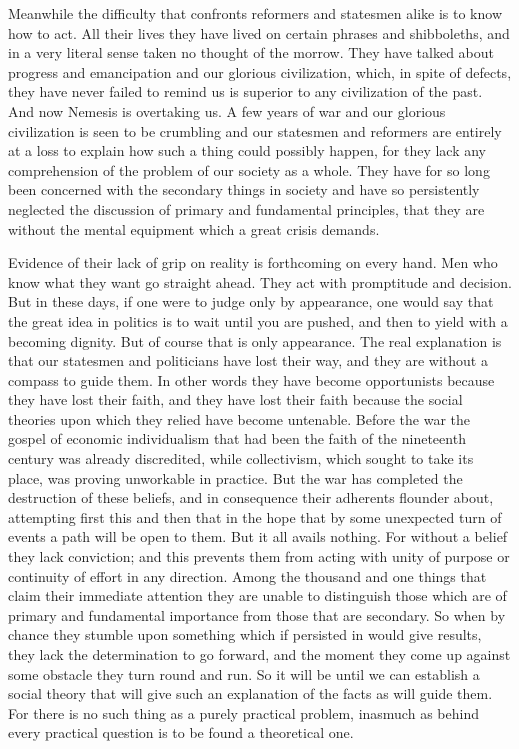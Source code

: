 \documentclass{book}
\begin{document}
Meanwhile the difficulty that confronts reformers and statesmen alike is to know how to act. All their lives they have lived on certain phrases and shibboleths, and in a very literal sense taken no thought of the morrow. They have talked about progress and emancipation and our glorious civilization, which, in spite of defects, they have never failed to remind us is superior to any civilization of the past. And now Nemesis is overtaking us. A few years of war and our glorious civilization is seen to be crumbling and our statesmen and reformers are entirely at a loss to explain how such a thing could possibly happen, for they lack any comprehension of the problem of our society as a whole. They have for so long been concerned with the secondary things in society and have so persistently neglected the discussion of primary and fundamental principles, that they are without the mental equipment which a great crisis demands.

Evidence of their lack of grip on reality is forthcoming on every hand. Men who know what they want go straight ahead. They act with promptitude and decision. But in these days, if one were to judge only by appearance, one would say that the great idea in politics is to wait until you are pushed, and then to yield with a becoming dignity. But of course that is only appearance. The real explanation is that our statesmen and politicians have lost their way, and they are without a compass to guide them. In other words they have become opportunists because they have lost their faith, and they have lost their faith because the social theories upon which they relied have become untenable. Before the war the gospel of economic individualism that had been the faith of the nineteenth century was already discredited, while collectivism, which sought to take its place, was proving unworkable in practice. But the war has completed the destruction of these beliefs, and in consequence their adherents flounder about, attempting first this and then that in the hope that by some unexpected turn of events a path will be open to them. But it all avails nothing. For without a belief they lack conviction; and this prevents them from acting with unity of purpose or continuity of effort in any direction. Among the thousand and one things that claim their immediate attention they are unable to distinguish those which are of primary and fundamental importance from those that are secondary. So when by chance they stumble upon something which if persisted in would give results, they lack the determination to go forward, and the moment they come up against some obstacle they turn round and run. So it will be until we can establish a social theory that will give such an explanation of the facts as will guide them. For there is no such thing as a purely practical problem, inasmuch as behind every practical question is to be found a theoretical one.
\end{document}
